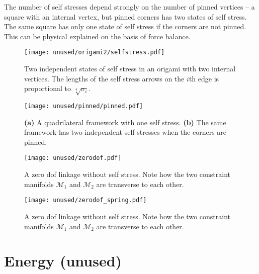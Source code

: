 The number of self stresses depend strongly on the number of pinned vertices -- a square with an internal vertex, but pinned corners has two states of self stress.  The same square has only one state of self stress if the corners are not pinned.
This can be physical explained on the basis of force balance.

\begin{figure}
  \begin{center}
    \texttt{[image: unused/origami2/selfstress.pdf]}
  \end{center}
  \caption{
    Two independent states of self stress in an origami with two internal vertices.
    The lengths of the self stress arrows on the $i$th edge is proportional to $\sqrt[4]{\sigma_{i}}$.
  }
  \label{fig:origami2_selfstress}
\end{figure}
%
\begin{figure}
  \begin{center}
    \texttt{[image: unused/pinned/pinned.pdf]}
  \end{center}
  \caption{
    \textsf{\textbf{(a)}} A quadrilateral framework with one self stress.
    \textsf{\textbf{(b)}} The same framework has two independent self stresses when the corners are pinned.
  }
  \label{fig:quad_pinned}
\end{figure}

\begin{figure}
  \begin{center}
    \texttt{[image: unused/zerodof.pdf]}
  \end{center}
\caption{A zero \ac{dof} linkage without self stress.  Note how the two constraint manifolds $\mathcal{M}_1$ and $\mathcal{M}_2$ are transverse to each other.}
  \label{fig:hello}
\end{figure}


\begin{figure}
  \begin{center}
    \texttt{[image: unused/zerodof\_spring.pdf]}
  \end{center}
\caption[foo]{A zero \ac{dof} linkage without self stress.  Note how the two constraint manifolds $\mathcal{M}_1$ and $\mathcal{M}_2$ are transverse to each other.}
  \label{fig:hello2}
\end{figure}
\pagebreak

\section{Energy (unused)}
\label{sec:Energy (unused}


